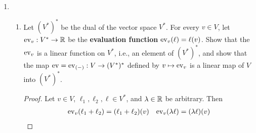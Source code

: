 \documentclass[../psets.tex]{subfiles}
\begin{document}
\begin{enumerate}[label={\textbf{1.2.\roman*.}}]
\begin{enumerate}
\begin{proof}
\begin{align*}
                &= \{(v_1+x_1,v_2)\mid x_1\in\R\}\\
                &= \{(x_1,v_2)\mid x_1\in\R\}
            \end{align*}
            Since every line $x_2=a$ is a set of the form $\{(x_1,a)\mid x_1\in\R\}$, we have that $v+W$ is equal to the line $x_2=v_2$, as desired.
        \end{proof}
        \item Show that the sum of the cosets $x_2=a$ and $x_2=b$ is the coset $x_2=a+b$.
        \begin{proof}
            By part (1), every line $x_2=a$ is a set of the form $(0,a)+W$. Therefore, by the definition of addition on $V/W$,
            \begin{align*}
                [(0,a)+W]+[(0,b)+W] &= [(0,a)+(0,b)]+W\\
                &= (0,a+b)+W
            \end{align*}
            as desired.
        \end{proof}
        \item Show that the scalar multiple of the coset $x_2=c$ by the number $\lambda$ is the coset $x_2=\lambda c$.
        \begin{proof}
            Proceeding in a similar manner to part (2), we have that
            \begin{align*}
                \lambda[(0,c)+W] &= [\lambda(0,c)]+W\\
                &= (0,\lambda c)+W
            \end{align*}
            as desired.
        \end{proof}
    \end{enumerate}
    \item 
    \begin{enumerate}
        \item Let $(V^*)^*$ be the dual of the vector space $V^*$. For every $v\in V$, let $\operatorname{ev}_v:V^*\to\mathbb{R}$ be the \textbf{evaluation function} $\operatorname{ev}_v(\ell)=\ell(v)$. Show that the $\operatorname{ev}_v$ is a linear function on $V^*$, i.e., an element of $(V^*)^*$, and show that the map $\operatorname{ev}=\operatorname{ev}_{(-)}:V\to(V^*)^*$ defined by $v\mapsto\operatorname{ev}_v$ is a linear map of $V$ into $(V^*)^*$.
        \begin{proof}
            Let $v\in V$, $\ell_1,\ell_2,\ell\in V^*$, and $\lambda\in\mathbb{R}$ be arbitrary. Then
            \begin{align*}
                \eva_v(\ell_1+\ell_2) &= (\ell_1+\ell_2)(v)&
                    \eva_v(\lambda\ell) &= (\lambda\ell)(v)\\

\end{align*}
\end{proof}
\end{enumerate}
\end{enumerate}
\end{document}
